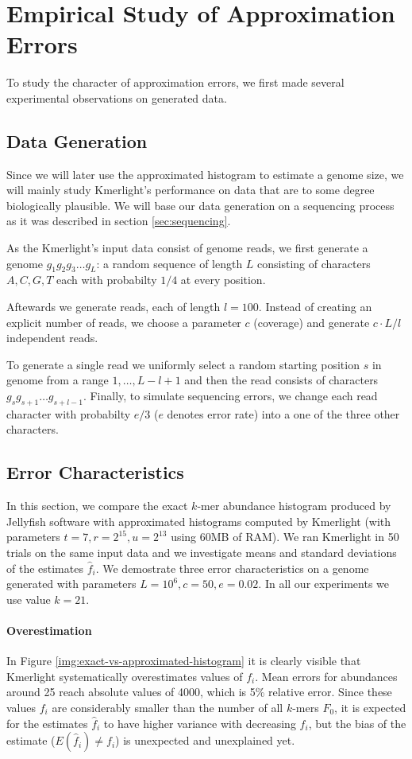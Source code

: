 \section{Empirical Study of Approximation Errors}
To study the character of approximation errors, we first made several experimental
observations on generated data.

\subsection{Data Generation}
\label{sec:data-generation}
Since we will later use the approximated histogram to estimate a genome size, 
we will mainly study Kmerlight's performance on data that are to some
degree biologically plausible. We will base our data generation on a sequencing
process as it was described in section \ref{sec:sequencing}.

As the Kmerlight's input data consist of genome reads, we first generate a genome 
$g_1g_2g_3 \dots g_L$: a random sequence of length $L$ consisting of characters $A, C, G, T$ 
each with probabilty $1/4$ at every position.

Aftewards we generate reads, each of length $l=100$. Instead of creating an explicit number
of reads, we choose a parameter $c$ (coverage) and generate $c \cdot L / l$ independent reads.

To generate a single read we uniformly select a random starting position $s$ in genome from
a range $1, \dots, L - l + 1$ and then the read consists of characters
$g_s g_{s+1} \dots g_{s+l-1}$. Finally, to simulate sequencing errors, we change each read
character with probabilty $e/3$ ($e$ denotes error rate) into a one of the three other characters.


\subsection{Error Characteristics}
\label{sec:error-characteristics}
In this section, we compare the exact $k$-mer abundance histogram produced by Jellyfish software
\cite{Marcais2011}
with approximated histograms computed by Kmerlight (with parameters $t=7, r=2^{15}, u=2^{13}$ using
60MB of RAM). We ran Kmerlight in 50 trials on the same input data and we investigate means and
standard deviations of the estimates $\hat f_i$. We demostrate three error characteristics
on a genome generated with parameters $L=10^6, c=50, e=0.02$. In all our experiments we
use value $k=21$.

\paragraph{Overestimation}
In Figure \ref{img:exact-vs-approximated-histogram} it is clearly visible that Kmerlight
systematically overestimates values of $f_i$. Mean errors for abundances around 25 reach
absolute values of 4000, which is 5\% relative error. Since these values $f_i$ are considerably
smaller than the number of all $k$-mers $F_0$, it is expected for the estimates $\hat f_i$ 
to have higher variance with decreasing $f_i$, but the bias of the estimate 
($E(\hat f_i) \neq f_i$) is unexpected and unexplained yet.  

